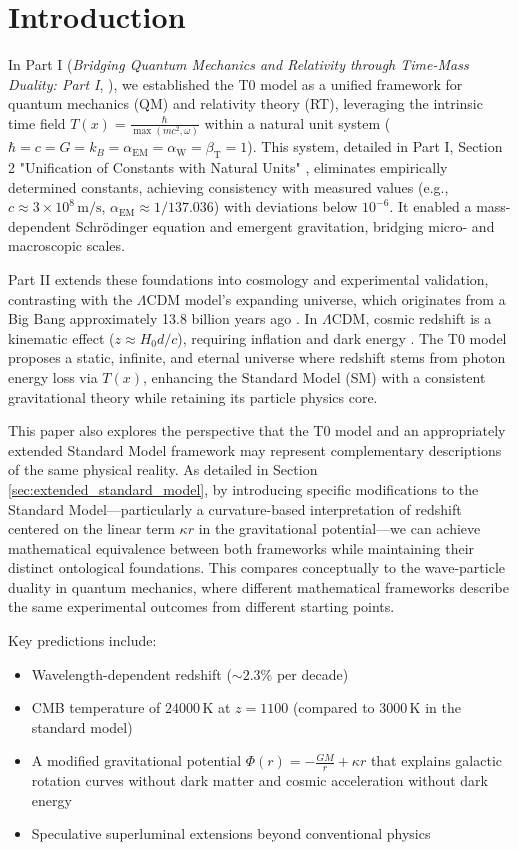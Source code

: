 \documentclass[12pt,a4paper]{article}
\newcommand{\Tfield}{T(x)}
\newcommand{\alphaEM}{\alpha_{\text{EM}}}
\newcommand{\alphaW}{\alpha_{\text{W}}}
\newcommand{\betaT}{\beta_{\text{T}}}
\newcommand{\LCDM}{\Lambda\text{CDM}}
\begin{document}
	\section{Introduction}
	In Part I (\textit{Bridging Quantum Mechanics and Relativity through Time-Mass Duality: Part I}, \cite{pascher_part1_2025}), we established the T0 model as a unified framework for quantum mechanics (QM) and relativity theory (RT), leveraging the intrinsic time field \(\Tfield = \frac{\hbar}{\max(mc^2, \omega)}\) within a natural unit system (\(\hbar = c = G = k_B = \alphaEM = \alphaW = \betaT = 1\)). This system, detailed in Part I, Section 2 "Unification of Constants with Natural Units" \cite{pascher_part1_2025}, eliminates empirically determined constants, achieving consistency with measured values (e.g., \(c \approx 3 \times 10^8 \, \text{m/s}\), \(\alphaEM \approx 1/137.036\)) with deviations below \(10^{-6}\). It enabled a mass-dependent Schrödinger equation and emergent gravitation, bridging micro- and macroscopic scales.
	
	Part II extends these foundations into cosmology and experimental validation, contrasting with the \(\LCDM\) model's expanding universe, which originates from a Big Bang approximately 13.8 billion years ago \cite{Planck2020}. In \(\LCDM\), cosmic redshift is a kinematic effect (\(z \approx H_0 d / c\)), requiring inflation and dark energy \cite{Riess1998,Perlmutter1999}. The T0 model proposes a static, infinite, and eternal universe where redshift stems from photon energy loss via \(\Tfield\), enhancing the Standard Model (SM) with a consistent gravitational theory while retaining its particle physics core.
	
	This paper also explores the perspective that the T0 model and an appropriately extended Standard Model framework may represent complementary descriptions of the same physical reality. As detailed in Section \ref{sec:extended_standard_model}, by introducing specific modifications to the Standard Model—particularly a curvature-based interpretation of redshift centered on the linear term \(\kappa r\) in the gravitational potential—we can achieve mathematical equivalence between both frameworks while maintaining their distinct ontological foundations. This compares conceptually to the wave-particle duality in quantum mechanics, where different mathematical frameworks describe the same experimental outcomes from different starting points.
	
	Key predictions include:
	\begin{itemize}
		\item Wavelength-dependent redshift (\(\sim 2.3\%\) per decade)
		\item CMB temperature of \(24000 \, \text{K}\) at \(z = 1100\) (compared to \(3000 \, \text{K}\) in the standard model)
		\item A modified gravitational potential \(\Phi(r) = -\frac{GM}{r} + \kappa r\) that explains galactic rotation curves without dark matter and cosmic acceleration without dark energy
		\item Speculative superluminal extensions beyond conventional physics
	\end{itemize}
	
\end{document}
